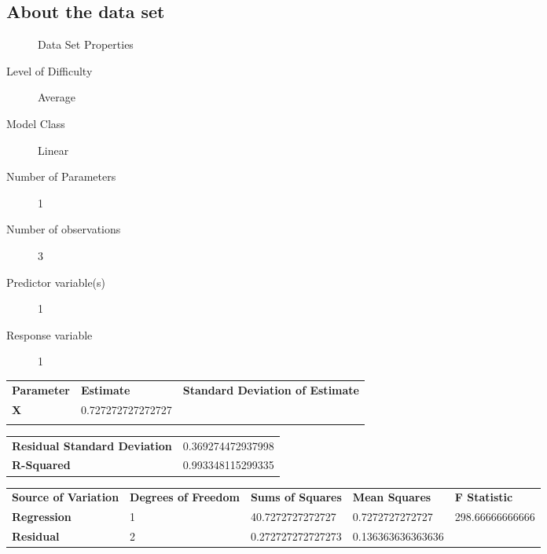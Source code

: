 \documentclass[10pt]{article}
\begin{document}
\subsection*{About the data set}

\begin{description}
   \item[]Data Set Properties
   \item[Level of Difficulty]Average
   \item[Model Class]Linear
   \item[Number of Parameters]1
   \item[Number of observations]3
   \item[Predictor variable(s)]1
   \item[Response variable]1
\end{description}

\begin{tabular}{lll}
   \textbf{Parameter} & \textbf{Estimate} & \textbf{Standard Deviation of Estimate}  \\ 
	\textbf{X} &   0.727272727272727 &   \\ 
	  &   &  \\ 
\end{tabular} 

\begin{tabular}{ll}
    \textbf{Residual Standard Deviation} & 0.369274472937998    \\ 
    \textbf{R-Squared} & 0.993348115299335   \\  
\end{tabular}


\begin{tabular}{lllll}
   \textbf{Source of Variation} & \textbf{Degrees of Freedom} & \textbf{Sums of Squares} & \textbf{Mean Squares}  & \textbf{F Statistic} \\ 
   \textbf{Regression} & 1 & 40.7272727272727 & 0.7272727272727 & 298.66666666666 \\ 
	\textbf{Residual} & 2 & 0.272727272727273 & 0.136363636363636  \\ 
\end{tabular} 
\end{document}
